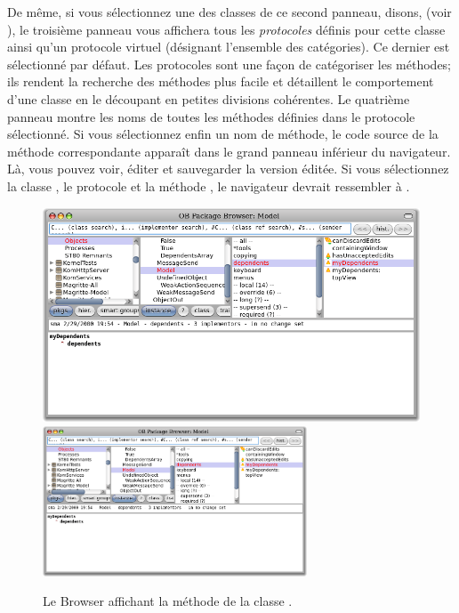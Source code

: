 \documentclass[a4paper,10pt,twoside]{book}
\begin{document}
De même, si vous sélectionnez une des classes de ce second panneau,
disons,  (voir  ), le troisième
panneau vous affichera tous les \emph{protocoles} définis pour cette
classe ainsi qu'un protocole virtuel  (désignant l'ensemble 
des catégories). Ce dernier est sélectionné par défaut. 
Les protocoles sont une façon de catégoriser les méthodes;
ils rendent la recherche des méthodes plus facile et détaillent
le comportement d'une classe en le découpant en petites divisions 
cohérentes.
Le quatrième panneau montre les noms de toutes les méthodes définies dans le protocole sélectionné.
Si vous sélectionnez enfin un nom de méthode, le code source de la 
méthode correspondante apparaît dans le grand panneau inférieur
du navigateur. Là, vous pouvez voir, éditer et sauvegarder la version éditée.
Si vous sélectionnez la classe
, le protocole  et la méthode , 
le navigateur devrait ressembler à .

\begin{figure}[htbp]
   \centering
   \ifluluelse
	   {\includegraphics[width=\textwidth]{SystemBrowserMyDependents}}
	   {\includegraphics[width=0.7\textwidth]{SystemBrowserMyDependents}}
   \caption{Le Browser affichant la méthode  de la classe .
   }
\end{figure}
\end{document}
